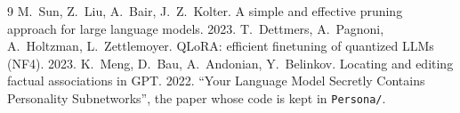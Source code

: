 \documentclass[11pt]{article}
\newcommand{\code}[1]{\texttt{#1}}
\begin{document}
\begin{thebibliography}{9}\small
{} M.~Sun, Z.~Liu, A.~Bair, J.~Z.~Kolter. A simple and effective pruning approach for large language models. 2023.
 T.~Dettmers, A.~Pagnoni, A.~Holtzman, L.~Zettlemoyer. QLoRA: efficient finetuning of quantized LLMs (NF4). 2023.
 K.~Meng, D.~Bau, A.~Andonian, Y.~Belinkov. Locating and editing factual associations in GPT. 2022.
 ``Your Language Model Secretly Contains Personality Subnetworks'', the paper whose code is kept in \code{Persona/}.
\end{thebibliography}
\end{document}
